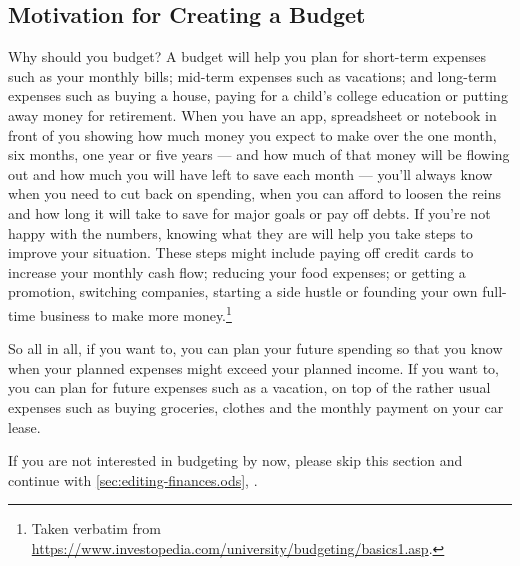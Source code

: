 \subsection{Motivation for Creating a Budget}
\label{subsec:motivation-creating-budget}

Why should you budget? A budget will help you plan for short-term expenses such as your monthly bills; mid-term expenses such as vacations; and long-term expenses such as buying a house, paying for a child’s college education or putting away money for retirement.
When you have an app, spreadsheet or notebook in front of you showing how much money you expect to make over the one month, six months, one year or five years --- and how much of that money will be flowing out and how much you will have left to save each month --- you’ll always know when you need to cut back on spending, when you can afford to loosen the reins and how long it will take to save for major goals or pay off debts.
If you’re not happy with the numbers, knowing what they are will help you take steps to improve your situation.
These steps might include paying off credit cards to increase your monthly cash flow; reducing your food expenses; or getting a promotion, switching companies, starting a side hustle or founding your own full-time business to make more money.\footnote{Taken verbatim from \url{https://www.investopedia.com/university/budgeting/basics1.asp}.}

So all in all, if you want to, you can plan your future spending so that you know when your planned expenses might exceed your planned income.
If you want to, you can plan for future expenses such as a vacation, on top of the rather usual expenses such as buying groceries, clothes and the monthly payment on your car lease.

\begin{specialnote}
	If you are not interested in budgeting by now, please skip this section and continue with \autoref{sec:editing-finances.ods}, .
\end{specialnote}

